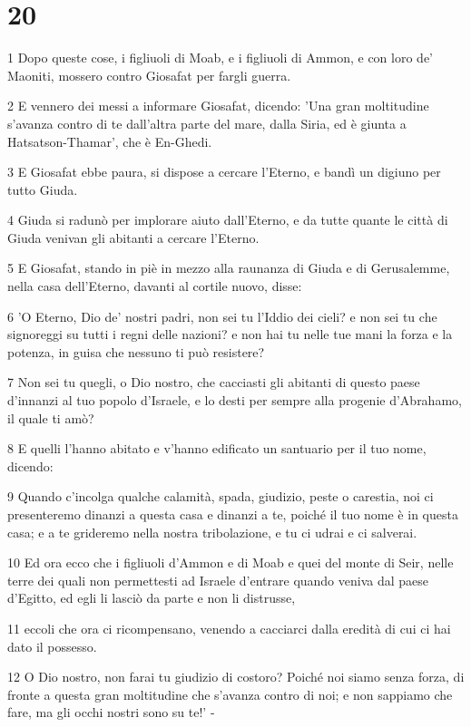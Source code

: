 \chapter{20}

\par 1 Dopo queste cose, i figliuoli di Moab, e i figliuoli di Ammon, e con loro de' Maoniti, mossero contro Giosafat per fargli guerra.
\par 2 E vennero dei messi a informare Giosafat, dicendo: 'Una gran moltitudine s'avanza contro di te dall'altra parte del mare, dalla Siria, ed è giunta a Hatsatson-Thamar', che è En-Ghedi.
\par 3 E Giosafat ebbe paura, si dispose a cercare l'Eterno, e bandì un digiuno per tutto Giuda.
\par 4 Giuda si radunò per implorare aiuto dall'Eterno, e da tutte quante le città di Giuda venivan gli abitanti a cercare l'Eterno.
\par 5 E Giosafat, stando in piè in mezzo alla raunanza di Giuda e di Gerusalemme, nella casa dell'Eterno, davanti al cortile nuovo, disse:
\par 6 'O Eterno, Dio de' nostri padri, non sei tu l'Iddio dei cieli? e non sei tu che signoreggi su tutti i regni delle nazioni? e non hai tu nelle tue mani la forza e la potenza, in guisa che nessuno ti può resistere?
\par 7 Non sei tu quegli, o Dio nostro, che cacciasti gli abitanti di questo paese d'innanzi al tuo popolo d'Israele, e lo desti per sempre alla progenie d'Abrahamo, il quale ti amò?
\par 8 E quelli l'hanno abitato e v'hanno edificato un santuario per il tuo nome, dicendo:
\par 9 Quando c'incolga qualche calamità, spada, giudizio, peste o carestia, noi ci presenteremo dinanzi a questa casa e dinanzi a te, poiché il tuo nome è in questa casa; e a te grideremo nella nostra tribolazione, e tu ci udrai e ci salverai.
\par 10 Ed ora ecco che i figliuoli d'Ammon e di Moab e quei del monte di Seir, nelle terre dei quali non permettesti ad Israele d'entrare quando veniva dal paese d'Egitto, ed egli li lasciò da parte e non li distrusse,
\par 11 eccoli che ora ci ricompensano, venendo a cacciarci dalla eredità di cui ci hai dato il possesso.
\par 12 O Dio nostro, non farai tu giudizio di costoro? Poiché noi siamo senza forza, di fronte a questa gran moltitudine che s'avanza contro di noi; e non sappiamo che fare, ma gli occhi nostri sono su te!' -

